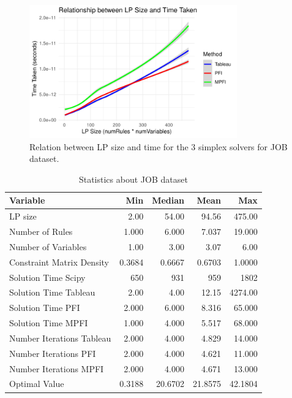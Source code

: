\begin{figure}[h]
    \centering
    \includegraphics[width=0.8\textwidth]{figures/lp_size_vs_time_job.pdf}
    \caption{Relation between LP size and time for the 3 simplex solvers for JOB dataset.}
    \label{fig:lp_size_vs_time_job}
\end{figure}

\begin{table}
    \centering
    \caption{Statistics about JOB dataset}
    \begin{tabular}{lrrrr}
        \toprule
        Variable                  & Min    & Median  & Mean    & Max     \\
        \midrule
        LP size                   & 2.00   & 54.00   & 94.56   & 475.00  \\
        Number of Rules           & 1.000  & 6.000   & 7.037   & 19.000  \\
        Number of Variables       & 1.00   & 3.00    & 3.07    & 6.00    \\
        Constraint Matrix Density & 0.3684 & 0.6667  & 0.6703  & 1.0000  \\
        Solution Time Scipy       & 650    & 931     & 959     & 1802    \\
        Solution Time Tableau     & 2.00   & 4.00    & 12.15   & 4274.00 \\
        Solution Time PFI         & 2.000  & 6.000   & 8.316   & 65.000  \\
        Solution Time MPFI        & 1.000  & 4.000   & 5.517   & 68.000  \\
        Number Iterations Tableau & 2.000  & 4.000   & 4.829   & 14.000  \\
        Number Iterations PFI     & 2.000  & 4.000   & 4.621   & 11.000  \\
        Number Iterations MPFI    & 2.000  & 4.000   & 4.671   & 13.000  \\
        Optimal Value             & 0.3188 & 20.6702 & 21.8575 & 42.1804 \\
        \bottomrule
    \end{tabular}
\end{table}

